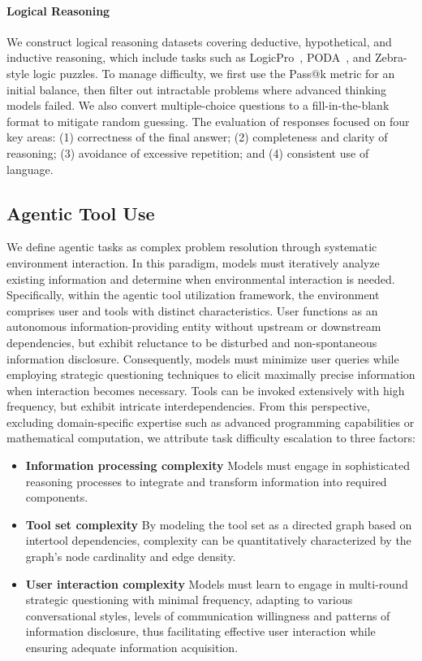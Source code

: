 \documentclass{article}
\begin{document}
\paragraph{Logical Reasoning}

We construct logical reasoning datasets covering deductive, hypothetical, and inductive reasoning, which include tasks such as LogicPro~\citep{jiang-etal-2025-logicpro}, PODA~\citep{wang2025PODA}, and Zebra-style logic puzzles. To manage difficulty, we first use the Pass@k metric for an initial balance, then filter out intractable problems where advanced thinking models failed. We also convert multiple-choice questions to a fill-in-the-blank format to mitigate random guessing. The evaluation of responses focused on four key areas: (1) correctness of the final answer; (2) completeness and clarity of reasoning; (3) avoidance of excessive repetition; and (4) consistent use of language.

\subsection{Agentic Tool Use}
We define agentic tasks as complex problem resolution through systematic environment interaction. In this paradigm, models must iteratively analyze existing information and determine when environmental interaction is needed. Specifically, within the agentic tool utilization framework, the environment comprises user and tools with distinct characteristics. User functions as an autonomous information-providing entity without upstream or downstream dependencies, but exhibit reluctance to be disturbed and non-spontaneous information disclosure. Consequently, models must minimize user queries while employing strategic questioning techniques to elicit maximally precise information when interaction becomes necessary. Tools can be invoked extensively with high frequency, but exhibit intricate interdependencies. From this perspective, excluding domain-specific expertise such as advanced programming capabilities or mathematical computation, we attribute task difficulty escalation to three factors:
\begin{itemize}
\item \textbf{Information processing complexity} 
Models must engage in sophisticated reasoning processes to integrate and transform information into required components.
\item \textbf{Tool set complexity} 
By modeling the tool set as a directed graph based on intertool dependencies, complexity can be quantitatively characterized by the graph's node cardinality and edge density.
\item \textbf{User interaction complexity}
Models must learn to engage in multi-round strategic questioning with minimal frequency, adapting to various conversational styles, levels of communication willingness and patterns of information disclosure, thus facilitating effective user interaction while ensuring adequate information acquisition.
\end{itemize}
\end{document}
